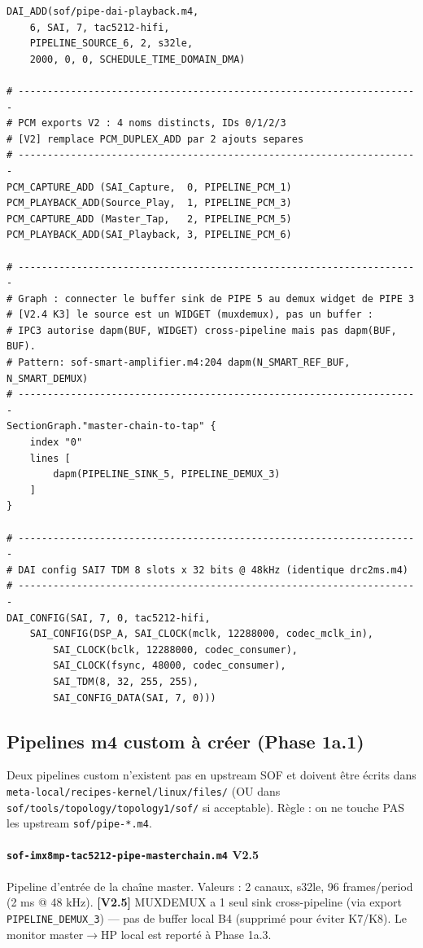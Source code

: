 \documentclass[11pt,a4paper]{article}
\begin{document}
\begin{lstlisting}[language={}, basicstyle=\ttfamily\scriptsize]
DAI_ADD(sof/pipe-dai-playback.m4,
    6, SAI, 7, tac5212-hifi,
    PIPELINE_SOURCE_6, 2, s32le,
    2000, 0, 0, SCHEDULE_TIME_DOMAIN_DMA)

# ---------------------------------------------------------------------
# PCM exports V2 : 4 noms distincts, IDs 0/1/2/3
# [V2] remplace PCM_DUPLEX_ADD par 2 ajouts separes
# ---------------------------------------------------------------------
PCM_CAPTURE_ADD (SAI_Capture,  0, PIPELINE_PCM_1)
PCM_PLAYBACK_ADD(Source_Play,  1, PIPELINE_PCM_3)
PCM_CAPTURE_ADD (Master_Tap,   2, PIPELINE_PCM_5)
PCM_PLAYBACK_ADD(SAI_Playback, 3, PIPELINE_PCM_6)

# ---------------------------------------------------------------------
# Graph : connecter le buffer sink de PIPE 5 au demux widget de PIPE 3
# [V2.4 K3] le source est un WIDGET (muxdemux), pas un buffer :
# IPC3 autorise dapm(BUF, WIDGET) cross-pipeline mais pas dapm(BUF, BUF).
# Pattern: sof-smart-amplifier.m4:204 dapm(N_SMART_REF_BUF, N_SMART_DEMUX)
# ---------------------------------------------------------------------
SectionGraph."master-chain-to-tap" {
    index "0"
    lines [
        dapm(PIPELINE_SINK_5, PIPELINE_DEMUX_3)
    ]
}

# ---------------------------------------------------------------------
# DAI config SAI7 TDM 8 slots x 32 bits @ 48kHz (identique drc2ms.m4)
# ---------------------------------------------------------------------
DAI_CONFIG(SAI, 7, 0, tac5212-hifi,
    SAI_CONFIG(DSP_A, SAI_CLOCK(mclk, 12288000, codec_mclk_in),
        SAI_CLOCK(bclk, 12288000, codec_consumer),
        SAI_CLOCK(fsync, 48000, codec_consumer),
        SAI_TDM(8, 32, 255, 255),
        SAI_CONFIG_DATA(SAI, 7, 0)))
\end{lstlisting}

\subsection{Pipelines m4 custom à créer (Phase 1a.1)}

Deux pipelines custom n'existent pas en upstream SOF et doivent être écrits dans \texttt{meta-local/recipes-kernel/linux/files/} (OU dans \texttt{sof/tools/topology/topology1/sof/} si acceptable). Règle : on ne touche PAS les upstream \texttt{sof/pipe-*.m4}.

\paragraph{\texttt{sof-imx8mp-tac5212-pipe-masterchain.m4} V2.5}
Pipeline d'entrée de la chaîne master. Valeurs : 2 canaux, s32le, 96 frames/period (2 ms @ 48 kHz). \textbf{[V2.5]} MUXDEMUX a 1 seul sink cross-pipeline (via export \texttt{PIPELINE\_DEMUX\_3}) --- pas de buffer local B4 (supprimé pour éviter K7/K8). Le monitor master$\rightarrow$HP local est reporté à Phase 1a.3.
\end{document}
